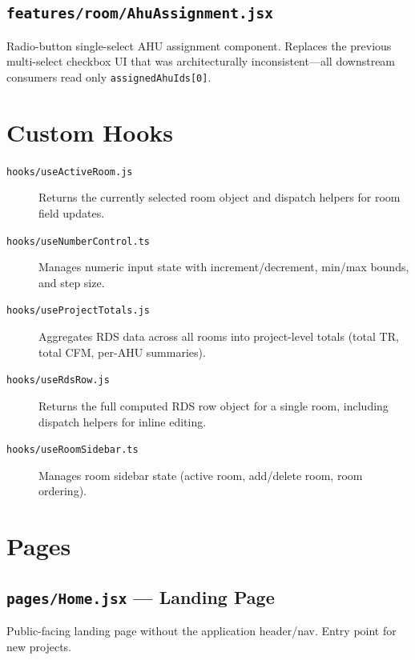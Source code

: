 \documentclass[12pt, a4paper, oneside]{report}
\newcommand{\file}[1]{\texttt{\textcolor{codeblue}{#1}}}
\newcommand{\code}[1]{\texttt{\textcolor{codered}{#1}}}
\begin{document}
\section{\file{features/room/AhuAssignment.jsx}}

Radio-button single-select AHU assignment component. Replaces the previous multi-select checkbox UI that was architecturally inconsistent---all downstream consumers read only \code{assignedAhuIds[0]}.


\chapter{Custom Hooks}

\begin{description}
  \item[\file{hooks/useActiveRoom.js}] Returns the currently selected room object and dispatch helpers for room field updates.

  \item[\file{hooks/useNumberControl.ts}] Manages numeric input state with increment/decrement, min/max bounds, and step size.

  \item[\file{hooks/useProjectTotals.js}] Aggregates RDS data across all rooms into project-level totals (total TR, total CFM, per-AHU summaries).

  \item[\file{hooks/useRdsRow.js}] Returns the full computed RDS row object for a single room, including dispatch helpers for inline editing.

  \item[\file{hooks/useRoomSidebar.ts}] Manages room sidebar state (active room, add/delete room, room ordering).
\end{description}


\chapter{Pages}

\section{\file{pages/Home.jsx} --- Landing Page}
Public-facing landing page without the application header/nav. Entry point for new projects.
\end{document}
